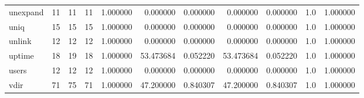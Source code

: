 \begin{tabular}{lrrrrrrrrrr}
unexpand  &                                      11 &                 11 &                                11 &                                   1.000000 &                               0.000000 &                                     0.000000 &                          0.000000 &                                0.000000 &                                1.0 &                                           1.000000 \\
uniq      &                                      15 &                 15 &                                15 &                                   1.000000 &                               0.000000 &                                     0.000000 &                          0.000000 &                                0.000000 &                                1.0 &                                           1.000000 \\
unlink    &                                      12 &                 12 &                                12 &                                   1.000000 &                               0.000000 &                                     0.000000 &                          0.000000 &                                0.000000 &                                1.0 &                                           1.000000 \\
uptime    &                                      18 &                 19 &                                18 &                                   1.000000 &                              53.473684 &                                     0.052220 &                         53.473684 &                                0.052220 &                                1.0 &                                           1.000000 \\
users     &                                      12 &                 12 &                                12 &                                   1.000000 &                               0.000000 &                                     0.000000 &                          0.000000 &                                0.000000 &                                1.0 &                                           1.000000 \\
vdir      &                                      71 &                 75 &                                71 &                                   1.000000 &                              47.200000 &                                     0.840307 &                         47.200000 &                                0.840307 &                                1.0 &                                           1.000000 \\

\end{tabular}

